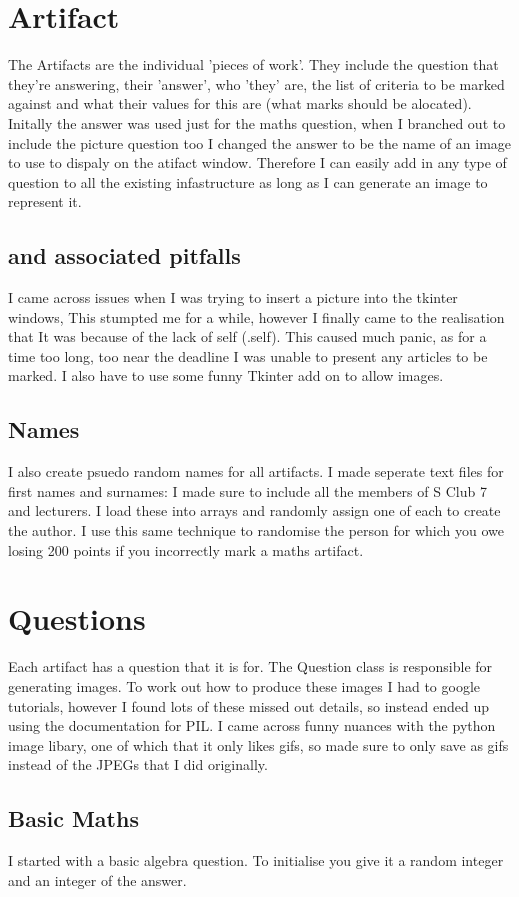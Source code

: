\documentclass[twocolumn]{article}   %
\begin{document}
\section{Artifact}
The Artifacts are the individual 'pieces of work'. They include the question that they're answering, their 'answer', who 'they' are, the list of criteria to be marked against and what their values for this are (what marks should be alocated).
Initally the answer was used just for the maths question, when I branched out to include the picture question too I changed the answer to be the name of an image to use to dispaly on the atifact window. Therefore I can easily add in any type of question to all the existing infastructure as long as I can generate an image to represent it.
  \subsection{and associated pitfalls}
  I came across issues when I was trying to insert a picture into the tkinter windows, This stumpted me for a while, however I finally came to the realisation that It was because of the lack of self (.self). This caused much panic, as for a time too long, too near the deadline I was unable to present any articles to be marked. I also have to use some funny Tkinter add on to allow images.
  \subsection{Names}
  I also create psuedo random names for all artifacts. I made seperate text files for first names and surnames: I made sure to include all the members of S Club 7 and lecturers. I load these into arrays and randomly assign one of each to create the author. I use this same technique to randomise the person for which you owe losing 200 points if you incorrectly mark a maths artifact.

\section{Questions}
Each artifact has a question that it is for. The Question class is responsible for generating images. To work out how to produce these images I had to google tutorials, however I found lots of these missed out details, so instead ended up using the documentation for PIL\cite{PIL}. I came across funny nuances with the python image libary, one of which that it only likes gifs, so made sure to only save as gifs instead of the JPEGs that I did originally.
  \subsection{Basic Maths}
  I started with a basic algebra question. To initialise you give it a random integer and an integer of the answer.
\end{document}
